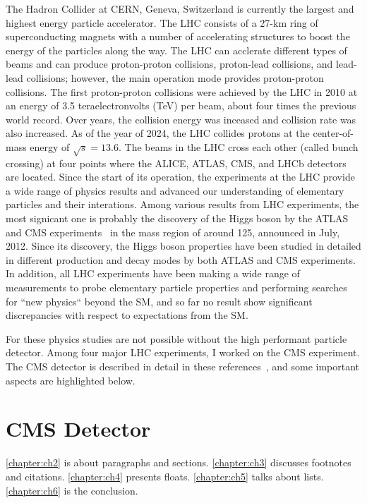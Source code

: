 %
%
The Hadron Collider at CERN, Geneva, Switzerland is currently the largest and highest energy particle accelerator.
The LHC consists of a 27-km ring of superconducting magnets with a number of accelerating structures to boost the energy of the particles along the way.
The LHC can acclerate different types of beams and can produce proton-proton collisions, proton-lead collisions, and lead-lead collisions; however, the main operation mode provides proton-proton collisions.
%
The first proton-proton collisions were achieved by the LHC in 2010 at an energy of 3.5 teraelectronvolts (TeV) per beam, about four times the previous world record.
Over years, the collision energy was inceased and collision rate was also increased.
As of the year of 2024, the LHC collides protons at the center-of-mass energy of $\sqrt{s}=13.6$\TeV.
%
The beams in the LHC cross each other (called bunch crossing) at four points where the ALICE, ATLAS, CMS, and LHCb detectors are located.
%
Since the start of its operation, the experiments at the LHC provide a wide range of physics results and advanced our understanding of elementary particles and their interations.
%
Among various results from LHC experiments, the most signicant one is probably the discovery of the Higgs boson by the ATLAS and CMS experiments~\cite{ATLAS:2012yve,CMS:2012qbp,CMS:2013btf}
in the mass region of around 125\GeV, announced in July, 2012.
%
Since its discovery, the Higgs boson properties have been studied in detailed in different production and decay modes by both ATLAS and CMS experiments.
In addition, all LHC experiments have been making a wide range of measurements to probe elementary particle properties and performing searches for ``new physics`` beyond the SM, and so far no result show significant discrepancies with respect to expectations from the SM.

%
%
%
For these physics studies are not possible without the high performant particle detector.
Among four major LHC experiments, I worked on the CMS experiment.
The CMS detector is described in detail in these references~\cite{CMS,CMS:2023gfb}, and some important aspects are highlighted below.

%
%
%
\section{CMS Detector}








\cref{chapter:ch2} is about paragraphs and sections.
\cref{chapter:ch3} discusses footnotes and citations.
\cref{chapter:ch4} presents floats.
\cref{chapter:ch5} talks about lists.
\cref{chapter:ch6} is the conclusion.
